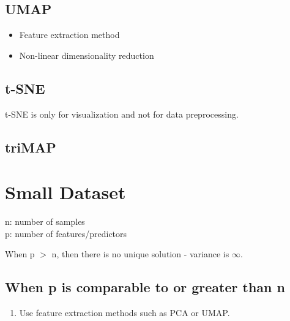 \documentclass[a4paper, 12pt]{report}
\begin{document}
\subsection{UMAP}
\begin{itemize}
\item Feature extraction method
\item Non-linear dimensionality reduction
\end{itemize}

\subsection{t-SNE}
t-SNE is only for visualization and not for data preprocessing.

\subsection{triMAP}



\section{Small Dataset}
\label{sec:smalldatasize}
n: number of samples\\
p: number of features/predictors


When p $>$ n, then there is no unique solution - variance is $\infty$.
\subsection{When p is comparable to or greater than n}
\begin{enumerate}

\item Use feature extraction methods such as PCA or UMAP.

\end{enumerate}
\end{document}
